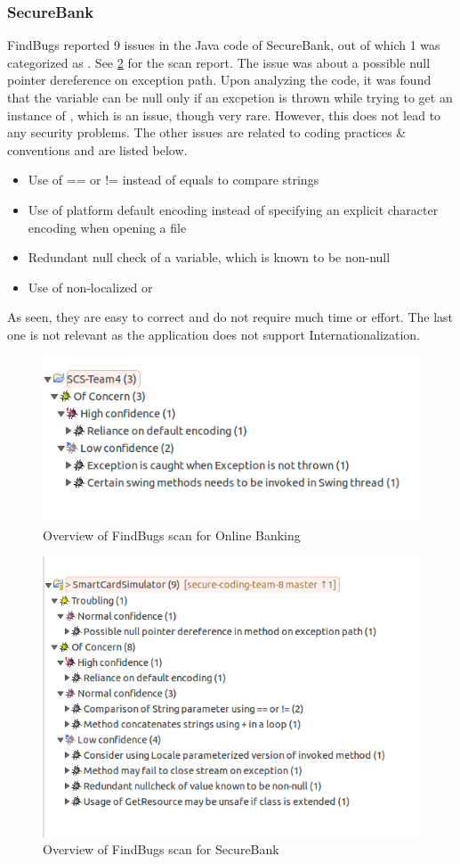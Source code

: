 \subsubsection{SecureBank}
FindBugs reported 9 issues in the Java code of SecureBank, out of which 1 was categorized as . See \ref{fig:findbugs_overview_secure_bank} for the scan report.
The issue was about a possible null pointer dereference on exception path. Upon analyzing the code, it was found that the variable can be null only if an excpetion is thrown while trying to get an instance of , which is an issue, though very rare. However, this does not lead to any security problems.
The other issues are related to coding practices \& conventions and are listed below.
\begin{itemize}
	\item Use of == or != instead of equals to compare strings
	\item Use of platform default encoding instead of specifying an explicit character encoding when opening a file
	\item Redundant null check of a variable, which is known to be non-null
	\item Use of non-localized  or 
\end{itemize}
As seen, they are easy to correct and do not require much time or effort. The last one is not relevant as the application does not support Internationalization.

\begin{figure}[ht]
	\centering
	\includegraphics[width=.8\linewidth]{figures/findbugs_overview.png}
	\caption{Overview of FindBugs scan for Online Banking}
	\label{fig:findbugs_overview}
\end{figure}

\begin{figure}[ht]
	\centering
	\includegraphics[width=.8\linewidth]{figures/findbugs_overview_secure_bank.png}
	\caption{Overview of FindBugs scan for SecureBank}
	\label{fig:findbugs_overview_secure_bank}
\end{figure}